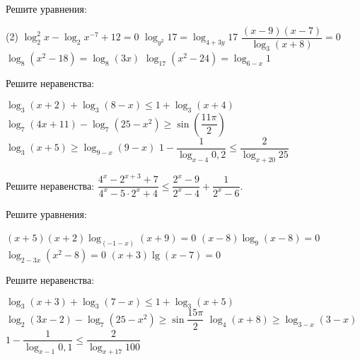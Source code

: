 \begin{class}[number=2]
	\begin{listofex}
		\item Решите уравнения: %
		\begin{tasks}(2)
			\task \( \log_2^2 x - \log_2 x^{-7} + 12 = 0 \)
			\task \( \log_{y^2}17=\log_{4+3y}17 \)
			\task \( \dfrac{ (x-9)(x-7) }{ \log_3(x+8) }=0 \)
			\task \( \log_8(x^2-18)=\log_8(3x) \)
			\task \( \log_{17}(x^2-24)=\log_{6-x}1 \)
		\end{tasks}
		\item Решите неравенства: %
		\begin{tasks}
			\task \( \log_3(x+2)+\log_3(8-x)\le 1 + \log_3(x+4) \)
			\task \( \log_7(4x+11)-\log_7(25-x^2)\ge \sin \left( \dfrac{ 11\pi }{ 2 } \right) \)
			\task \( \log_3(x+5) \ge \log_{9-x}(9-x) \)
			\task \( 1-\dfrac{ 1 }{ \log_{x-4}0,2 } \le \dfrac{ 2 }{ \log_{x+20}25 } \)
		\end{tasks}
		\item Решите неравенства: \( \dfrac{ 4^x-2^{x+3}+7 }{ 4^x-5\cdot 2^x+4 } \le \dfrac{ 2^x-9 }{ 2^x-4 }+\dfrac{ 1 }{ 2^x-6 } \).
	\end{listofex}
\end{class}

\begin{homework}[number=1]
	\begin{listofex}
		\item Решите уравнения: %
		\begin{tasks}
			\task \( (x+5)(x+2)\log_{(-1-x)}(x+9)=0 \)
			\task \( (x-8)\log_9(x-8)=0 \)
			\task \( \log_{2-3x}(x^2-8)=0 \)
			\task \( (x+3)\lg(x-7)=0 \)
		\end{tasks}
		\item Решите неравенства: %
		\begin{tasks}
			\task \( \log_3 (x+3)+\log_3 (7-x) \le 1 + \log_3 (x+5) \)
			\task \( \log_2 (3x-2) - \log_7 (25-x^2) \ge \sin \dfrac{ 15\pi }{ 2 } \)
			\task \( \log_4 (x+8) \ge \log_{3-x} (3-x) \)
			\task \( 1-\dfrac{ 1 }{ \log_{x-1}0,1 } \le \dfrac{ 2 }{ \log_{x+17} 100 } \)
		\end{tasks}
	\end{listofex}
\end{homework}

